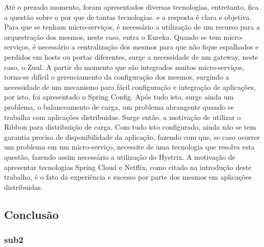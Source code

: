 \documentclass[journal]{IEEEtran}
\begin{document}
Até o prezado momento, foram apresentados diversas tecnologias, entretanto, fica a questão sobre o por que de tantas tecnologias. e a resposta é clara e objetiva. Para que se tenham micro-serviços, é necessário a utilização de um recurso para a orquestração dos mesmos, neste caso, entra o Eureka. Quando se tem micro-serviços, é necessário a centralização dos mesmos para que não fique espalhados e perdidos em hosts ou portas diferentes, surge a necessidade de um gateway, neste caso, o Zuul. A partir do momento que são integrados muitos micro-serviços, torna-se difícil o gerenciamento da configuração dos mesmos, surgindo a necessidade de um mecanismo para fácil configuração e integração de aplicações, por isto, foi apresentado o Spring Config. Após tudo isto, surge ainda um problema, o balanceamento de carga, um problema abrangente quando se trabalha com aplicações distribuidas. Surge então, a motivação de utilizar o Ribbon para distribuição de carga. Com tudo isto configurado, ainda não se tem garantia precisa de disponibilidade da aplicação, fazendo com que, se caso ocorrer um problema em um micro-serviço, necessite de uma tecnologia que resolva esta questão, fazendo assim necessário a utilização do Hystrix. A motivação de apresentar tecnologias Spring Cloud e Netflix, como citado na introdução deste trabalho, é o fato da experiência e sucesso por parte dos mesmos em aplicações distribuidas.


\subsection{Conclusão}
\subsubsection{sub2}


%
%
\end{document}
